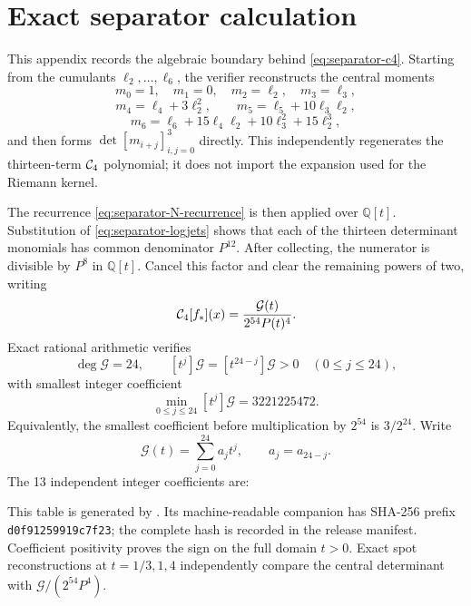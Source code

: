 \section{Exact separator calculation}
\label{app:separator}

This appendix records the algebraic boundary behind
\eqref{eq:separator-c4}.  Starting from the cumulants
\(\ell_2,\ldots,\ell_6\), the verifier reconstructs the central moments
\[
 m_0=1,\quad m_1=0,\quad m_2=\ell_2,\quad m_3=\ell_3,
\]
\[
 m_4=\ell_4+3\ell_2^2,\qquad
 m_5=\ell_5+10\ell_3\ell_2,
\]
\[
 m_6=\ell_6+15\ell_4\ell_2+10\ell_3^2+15\ell_2^3,
\]
and then forms \(\det[m_{i+j}]_{i,j=0}^3\) directly.  This independently
regenerates the thirteen-term \(\mathcal{C}_4\) polynomial; it does not import the
expansion used for the Riemann kernel.

The recurrence \eqref{eq:separator-N-recurrence} is then applied over
\(\mathbb Q[t]\).  Substitution of \eqref{eq:separator-logjets} shows that
each of the thirteen determinant monomials has common denominator \(P^{12}\).
After collecting, the numerator is divisible by \(P^8\) in \(\mathbb Q[t]\).
Cancel this factor and clear the remaining powers of two, writing
\[
 \mathcal{C}_4[f_*](x)=\frac{\mathcal G(t)}{2^{54}P(t)^4}.
\]
Exact rational arithmetic verifies
\[
 \deg\mathcal G=24,\qquad
 [t^j]\mathcal G=[t^{24-j}]\mathcal G>0
 \quad(0\leq j\leq24),
\]
with smallest integer coefficient
\[
 \min_{0\leq j\leq24}[t^j]\mathcal G=3221225472.
\]
Equivalently, the smallest coefficient before multiplication by \(2^{54}\)
is \(3/2^{24}\). Write
\[
 \mathcal G(t)=\sum_{j=0}^{24}a_jt^j,\qquad a_j=a_{24-j}.
\]
The 13 independent integer coefficients are:

This table is generated by
. Its machine-readable
companion  has SHA-256 prefix
\texttt{d0f91259919c7f23}; the complete hash is recorded in the release
manifest.
Coefficient positivity proves the sign on the full domain \(t>0\). Exact spot
reconstructions at \(t=1/3,1,4\) independently compare the
central determinant with \(\mathcal G/(2^{54}P^4)\).

